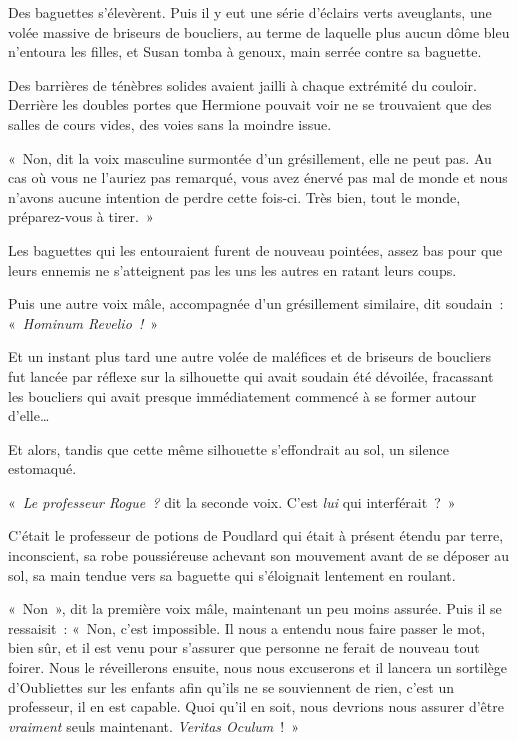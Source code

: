 Des baguettes s'élevèrent. Puis il y eut une série d'éclairs verts aveuglants, une volée massive de briseurs de boucliers, au terme de laquelle plus aucun dôme bleu n'entoura les filles, et Susan tomba à genoux, main serrée contre sa baguette.

Des barrières de ténèbres solides avaient jailli à chaque extrémité du couloir. Derrière les doubles portes que Hermione pouvait voir ne se trouvaient que des salles de cours vides, des voies sans la moindre issue.

«~Non, dit la voix masculine surmontée d'un grésillement, elle ne peut pas. Au cas où vous ne l'auriez pas remarqué, vous avez énervé pas mal de monde et nous n'avons aucune intention de perdre cette fois-ci. Très bien, tout le monde, préparez-vous à tirer.~»

Les baguettes qui les entouraient furent de nouveau pointées, assez bas pour que leurs ennemis ne s'atteignent pas les uns les autres en ratant leurs coups.

Puis une autre voix mâle, accompagnée d'un grésillement similaire, dit soudain~: «~\emph{Hominum Revelio~!}~»

Et un instant plus tard une autre volée de maléfices et de briseurs de boucliers fut lancée par réflexe sur la silhouette qui avait soudain été dévoilée, fracassant les boucliers qui avait presque immédiatement commencé à se former autour d'elle…

Et alors, tandis que cette même silhouette s'effondrait au sol, un silence estomaqué.

«~\emph{Le professeur Rogue~?} dit la seconde voix. C'est \emph{lui} qui interférait~?~»

C'était le professeur de potions de Poudlard qui était à présent étendu par terre, inconscient, sa robe poussiéreuse achevant son mouvement avant de se déposer au sol, sa main tendue vers sa baguette qui s'éloignait lentement en roulant.

«~Non~», dit la première voix mâle, maintenant un peu moins assurée. Puis il se ressaisit~: «~Non, c'est impossible. Il nous a entendu nous faire passer le mot, bien sûr, et il est venu pour s'assurer que personne ne ferait de nouveau tout foirer. Nous le réveillerons ensuite, nous nous excuserons et il lancera un sortilège d'Oubliettes sur les enfants afin qu'ils ne se souviennent de rien, c'est un professeur, il en est capable. Quoi qu'il en soit, nous devrions nous assurer d'être \emph{vraiment} seuls maintenant. \emph{Veritas Oculum}~!~»

